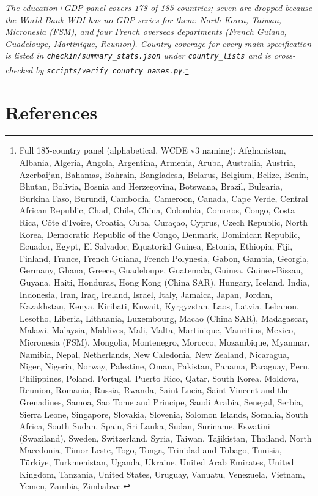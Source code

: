 \documentclass[12pt,letterpaper]{article}
\begin{document}
{\emph{The education+GDP panel covers 178 of 185 countries; seven are
dropped because the World Bank WDI has no GDP series for them: North
Korea, Taiwan, Micronesia (FSM), and four French overseas departments
(French Guiana, Guadeloupe, Martinique, Reunion). Country coverage for
every main specification is listed in
\texttt{checkin/summary\_stats.json} under \texttt{country\_lists} and
is cross-checked by
\texttt{scripts/verify\_country\_names.py}.}\footnote{Full 185-country
panel (alphabetical, WCDE v3 naming):
Afghanistan, Albania, Algeria, Angola, Argentina, Armenia, Aruba,
Australia, Austria, Azerbaijan, Bahamas, Bahrain, Bangladesh, Belarus,
Belgium, Belize, Benin, Bhutan, Bolivia, Bosnia and Herzegovina,
Botswana, Brazil, Bulgaria, Burkina Faso, Burundi, Cambodia, Cameroon,
Canada, Cape Verde, Central African Republic, Chad, Chile, China,
Colombia, Comoros, Congo, Costa Rica, C\^ote d'Ivoire, Croatia, Cuba,
Cura\c{c}ao, Cyprus, Czech Republic, North Korea, Democratic Republic
of the Congo, Denmark, Dominican Republic, Ecuador, Egypt, El Salvador,
Equatorial Guinea, Estonia, Ethiopia, Fiji, Finland, France, French
Guiana, French Polynesia, Gabon, Gambia, Georgia, Germany, Ghana,
Greece, Guadeloupe, Guatemala, Guinea, Guinea-Bissau, Guyana, Haiti,
Honduras, Hong Kong (China SAR), Hungary, Iceland, India, Indonesia,
Iran, Iraq, Ireland, Israel, Italy, Jamaica, Japan, Jordan, Kazakhstan,
Kenya, Kiribati, Kuwait, Kyrgyzstan, Laos, Latvia, Lebanon, Lesotho,
Liberia, Lithuania, Luxembourg, Macao (China SAR), Madagascar, Malawi,
Malaysia, Maldives, Mali, Malta, Martinique, Mauritius, Mexico,
Micronesia (FSM), Mongolia, Montenegro, Morocco, Mozambique, Myanmar,
Namibia, Nepal, Netherlands, New Caledonia, New Zealand, Nicaragua,
Niger, Nigeria, Norway, Palestine, Oman, Pakistan, Panama, Paraguay,
Peru, Philippines, Poland, Portugal, Puerto Rico, Qatar, South Korea,
Moldova, Reunion, Romania, Russia, Rwanda, Saint Lucia, Saint Vincent
and the Grenadines, Samoa, Sao Tome and Principe, Saudi Arabia, Senegal,
Serbia, Sierra Leone, Singapore, Slovakia, Slovenia, Solomon Islands,
Somalia, South Africa, South Sudan, Spain, Sri Lanka, Sudan, Suriname,
Eswatini (Swaziland), Sweden, Switzerland, Syria, Taiwan, Tajikistan,
Thailand, North Macedonia, Timor-Leste, Togo, Tonga, Trinidad and
Tobago, Tunisia, T\"urkiye, Turkmenistan, Uganda, Ukraine, United Arab
Emirates, United Kingdom, Tanzania, United States, Uruguay, Vanuatu,
Venezuela, Vietnam, Yemen, Zambia, Zimbabwe.}

}

\section*{References}\label{references}
\end{document}
